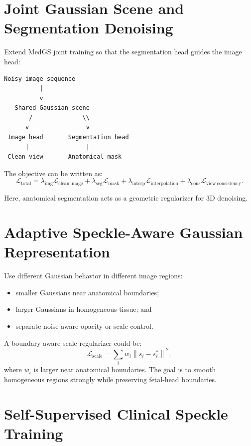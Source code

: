 \documentclass[11pt,a4paper]{article}
\begin{document}
\section{Joint Gaussian Scene and Segmentation Denoising}

Extend MedGS joint training so that the segmentation head guides the image head:

\begin{verbatim}
Noisy image sequence
          |
          v
   Shared Gaussian scene
       /              \\
      v                v
 Image head       Segmentation head
      |                |
 Clean view       Anatomical mask
\end{verbatim}

The objective can be written as:
\begin{equation}
    \mathcal{L}_{\mathrm{total}}
    = \lambda_{\mathrm{img}}\mathcal{L}_{\mathrm{clean\ image}}
    + \lambda_{\mathrm{seg}}\mathcal{L}_{\mathrm{mask}}
    + \lambda_{\mathrm{interp}}\mathcal{L}_{\mathrm{interpolation}}
    + \lambda_{\mathrm{cons}}\mathcal{L}_{\mathrm{view\ consistency}}.
\end{equation}

Here, anatomical segmentation acts as a geometric regularizer for 3D denoising.

\section{Adaptive Speckle-Aware Gaussian Representation}

Use different Gaussian behavior in different image regions:
\begin{itemize}
    \item smaller Gaussians near anatomical boundaries;
    \item larger Gaussians in homogeneous tissue; and
    \item separate noise-aware opacity or scale control.
\end{itemize}

A boundary-aware scale regularizer could be:
\begin{equation}
    \mathcal{L}_{\mathrm{scale}}
    = \sum_i w_i\left\|s_i-s_i^*\right\|^2,
\end{equation}
where $w_i$ is larger near anatomical boundaries. The goal is to smooth homogeneous regions strongly while preserving fetal-head boundaries.

\section{Self-Supervised Clinical Speckle Training}
\end{document}
